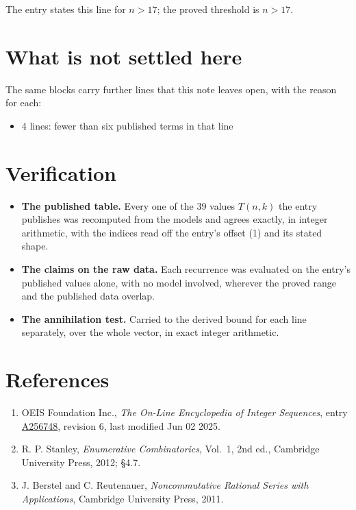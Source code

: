 \documentclass[11pt]{article}
\theoremstyle{definition}
\begin{document}
The entry states this line for $n > 17$; the proved threshold is $n > 17$.

\section{What is not settled here}

The same blocks carry further lines that this note leaves open, with the reason for each:

\begin{itemize}

\item 4 lines: fewer than six published terms in that line

\end{itemize}

\section{Verification}

\begin{itemize}

\item {\bfseries The published table.} Every one of the 39 values $T(n,k)$ the entry publishes was recomputed from the models and agrees exactly, in integer arithmetic, with the indices read off the entry's offset (1) and its stated shape.

\item {\bfseries The claims on the raw data.} Each recurrence was evaluated on the entry's published values alone, with no model involved, wherever the proved range and the published data overlap.

\item {\bfseries The annihilation test.} Carried to the derived bound for each line separately, over the whole vector, in exact integer arithmetic.

\end{itemize}

\section{References}

\begin{enumerate}

\item OEIS Foundation Inc., \emph{The On-Line Encyclopedia of Integer Sequences}, entry \href{https://oeis.org/A256748}{A256748}, revision 6, last modified Jun 02 2025.

\item R. P. Stanley, \emph{Enumerative Combinatorics}, Vol.~1, 2nd ed., Cambridge University Press, 2012; \S4.7.

\item J. Berstel and C. Reutenauer, \emph{Noncommutative Rational Series with Applications}, Cambridge University Press, 2011.

\end{enumerate}
\end{document}
